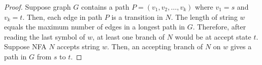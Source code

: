 \documentclass[11pt]{article}
\begin{document}
\begin{proof}
Suppose graph $G$ contains a path $P = (v_1,v_2,\dots,v_k)$ where $v_1 = s$ and $v_k = t$. Then, each edge in path $P$ is a transition in $N$. The length of string $w$ equals the maximum number of edges in a longest path in $G$. Therefore, after reading the last symbol of $w$, at least one branch of $N$ would be at accept state $t$. \\ 

Suppose NFA $N$ accepts string $w$. Then, an accepting branch of $N$ on $w$ gives a path in $G$ from $s$ to $t$.

\end{proof}
\end{document}
